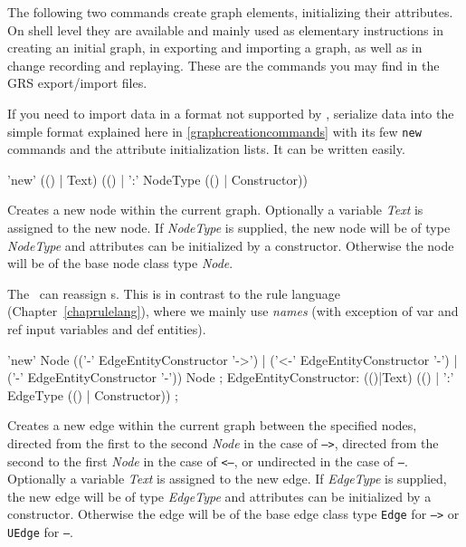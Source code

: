 The following two commands create graph elements, initializing their attributes.
On shell level they are available and mainly used as elementary instructions in creating an initial graph, in exporting and importing a graph, as well as in change recording and replaying.
These are the commands you may find in the GRS export/import files.


\begin{note}
If you need to import data in a format not supported by \GrG, serialize data into the simple format explained here in \ref{graphcreationcommands} with its few \texttt{new} commands and the attribute initialization lists.
It can be written easily.
\end{note}

\begin{rail}
  'new' (() | Text) (() | ':' NodeType (() | Constructor))
\end{rail}
Creates a new node within the current graph.
Optionally a variable \emph{Text} is assigned to the new node.
If \emph{NodeType} is supplied, the new node will be of type \emph{NodeType} and attributes can be initialized by a constructor.
Otherwise the node will be of the base node class type \emph{Node}.

\begin{note}
The \GrShell\ can reassign s.
This is in contrast to the rule language (Chapter~\ref{chaprulelang}), where we mainly use \emph{names}
(with exception of var and ref input variables and def entities).
\end{note}

\begin{rail}
  'new' Node (('-' EdgeEntityConstructor '->') | ('<-' EdgeEntityConstructor '-') | ('-' EdgeEntityConstructor '-')) Node ;
EdgeEntityConstructor:
  (()|Text) (() | ':' EdgeType (() | Constructor)) ;
\end{rail}
Creates a new edge within the current graph between the specified nodes,
directed from the first to the second \emph{Node} in the case of \texttt{-->},
directed from the second to the first \emph{Node} in the case of \texttt{<--},
or undirected in the case of \texttt{--}.
Optionally a variable \emph{Text} is assigned to the new edge.
If \emph{EdgeType} is supplied, the new edge will be of type \emph{EdgeType} and attributes can be initialized by a constructor.
Otherwise the edge will be of the base edge class type \texttt{Edge} for \texttt{-->} or \texttt{UEdge} for \texttt{--}.

